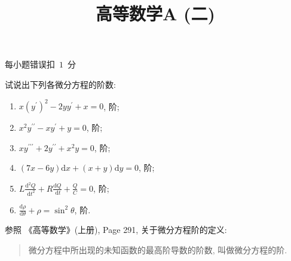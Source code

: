 \documentclass[answer]{THUExam}
\title{高等数学A (二)}
\author{}
\begin{document}
\vspace{1cm}
\makehead

\vspace{1cm}

 {每小题错误扣~$1$~分}

\begin{problem}
试说出下列各微分方程的阶数:
\begin{enumerate}
    \item $x\left(y^{\prime}\right)^2-2 y y^{\prime}+x=0$, \quad\fillin{$\quad 1\quad $}阶;
    \item $x^2 y^{\prime \prime}-x y^{\prime}+y=0$, \quad\fillin{$\quad 2\quad $}阶;
    \item $x y^{\prime \prime \prime}+2 y^{\prime \prime}+x^2 y=0$, \quad\fillin{$\quad 3\quad $}阶;
    \item $(7 x-6 y) \mathrm{d} x+(x+y) \mathrm{d} y=0$, \quad\fillin{$\quad 1\quad $}阶;
    \item $L \frac{\mathrm{d}^2 Q}{\mathrm{~d} t^2}+R \frac{\mathrm{d} Q}{\mathrm{~d} t}+\frac{Q}{C}=0$, \quad\fillin{$\quad 2\quad $}阶;
    \item $\frac{\mathrm{d} \rho}{\mathrm{d} \theta}+\rho=\sin ^2 \theta$, \quad\fillin{$\quad 1\quad $}阶.
\end{enumerate}
\end{problem}
\bigskip
\begin{note}
    参照 《高等数学》(上册), Page 291, 关于微分方程阶的定义:
    \begin{quote}
        微分方程中所出现的未知函数的最高阶导数的阶数, 叫做微分方程的阶.
    \end{quote}
\end{note}
\bigskip
\newpage
{}
\end{document}
